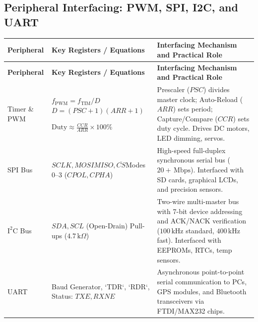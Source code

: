 \documentclass[12pt,a4paper]{article}
\begin{document}
\subsection{Peripheral Interfacing: PWM, SPI, I2C, and UART}
\par\vspace{6pt}\noindent
\begingroup
\setlength{\extrarowheight}{2.5pt}
\begingroup
\setlength{\LTleft}{0pt}
\setlength{\LTright}{0pt}
\begin{longtable}{|B{2.4cm}|B{3.8cm}|>{\small\raggedright\arraybackslash}m{\dimexpr(\linewidth-2.4cm-3.8cm-6\arrayrulewidth)/1\relax}|}
\hline
\textbf{Peripheral} & \textbf{Key Registers / Equations} & \textbf{Interfacing Mechanism and Practical Role} \\ \hline
\endfirsthead
\hline
\textbf{Peripheral} & \textbf{Key Registers / Equations} & \textbf{Interfacing Mechanism and Practical Role} \\ \hline
\endhead
Timer \& PWM & $f_{\mathrm{PWM}} = f_{\mathrm{TIM}}/D$\newline $D = (PSC+1)(ARR+1)$\par\smallskip $\text{Duty} \approx \frac{CCR}{ARR}\times 100\%$ & Prescaler ($PSC$) divides master clock; Auto-Reload ($ARR$) sets period; Capture/Compare ($CCR$) sets duty cycle. Drives DC motors, LED dimming, servos. \\ \hline
SPI Bus & $SCLK, MOSI$\newline $MISO, \overline{CS}$\newline Modes 0--3 ($CPOL, CPHA$) & High-speed full-duplex synchronous serial bus ($20+\,\mathrm{Mbps}$). Interfaced with SD cards, graphical LCDs, and precision sensors. \\ \hline
$\mathrm{I^2C}$ Bus & $SDA, SCL$ (Open-Drain) \newline Pull-ups ($4.7\,\mathrm{k}\Omega$) & Two-wire multi-master bus with 7-bit device addressing and ACK/NACK verification ($100\,\mathrm{kHz}$ standard, $400\,\mathrm{kHz}$ fast). Interfaced with EEPROMs, RTCs, temp sensors. \\ \hline
UART & Baud Generator, `TDR`, `RDR`, Status: $TXE, RXNE$ & Asynchronous point-to-point serial communication to PCs, GPS modules, and Bluetooth transceivers via FTDI/MAX232 chips. \\ \hline
\end{longtable}
\endgroup\par
\endgroup
\end{document}
